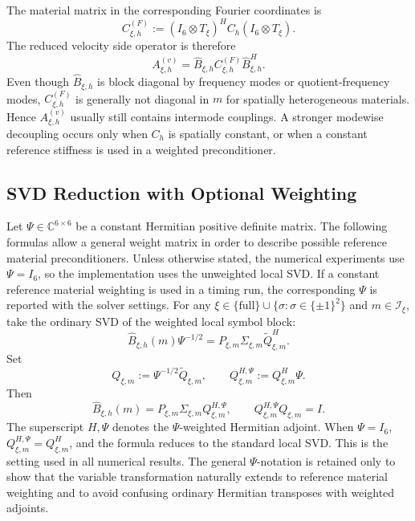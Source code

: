 \documentclass[11pt,oneside]{article}
\numberwithin{equation}{section}
\theoremstyle{plain}
\theoremstyle{remark}
\begin{document}
The material matrix in the corresponding Fourier coordinates is
\begin{equation}\label{eq:CF_xi_def}
C_{\xi,h}^{(F)}:=(I_6\otimes T_\xi)^HC_h(I_6\otimes T_\xi).
\end{equation}
The reduced velocity side operator is therefore
\begin{equation}\label{eq:Av_xi_def}
A_{\xi,h}^{(v)}=\widehat B_{\xi,h} C_{\xi,h}^{(F)}\widehat B_{\xi,h}^H.
\end{equation}
Even though \(\widehat B_{\xi,h}\) is block diagonal by frequency modes or quotient-frequency modes, \(C_{\xi,h}^{(F)}\) is generally not diagonal in \(m\) for spatially heterogeneous materials. Hence \(A_{\xi,h}^{(v)}\) usually still contains intermode couplings. A stronger modewise decoupling occurs only when \(C_h\) is spatially constant, or when a constant reference stiffness is used in a weighted preconditioner.

\subsection{SVD Reduction with Optional Weighting}

Let \(\Psi\in\mathbb C^{6\times6}\) be a constant Hermitian positive definite matrix. The following formulas allow a general weight matrix in order to describe possible reference material preconditioners. Unless otherwise stated, the numerical experiments use \(\Psi=I_6\), so the implementation uses the unweighted local SVD. If a constant reference material weighting is used in a timing run, the corresponding \(\Psi\) is reported with the solver settings. For any \(\xi\in \{\mathrm{full}\}\cup\{\sigma:\sigma\in\{\pm1\}^2\}\) and \(m\in\mathcal I_\xi\), take the ordinary SVD of the weighted local symbol block:
\begin{equation}\label{eq:weighted_svd_unified}
\widehat B_{\xi,h}(m)\Psi^{-1/2}
=P_{\xi,m}\Sigma_{\xi,m}\widetilde Q_{\xi,m}^H.
\end{equation}
Set
\[
Q_{\xi,m}:=\Psi^{-1/2}\widetilde Q_{\xi,m},
\qquad
Q_{\xi,m}^{H,\Psi}:=Q_{\xi,m}^H\Psi .
\]
Then
\begin{equation}\label{eq:weighted_svd_local_unified}
\widehat B_{\xi,h}(m)=P_{\xi,m}\Sigma_{\xi,m}Q_{\xi,m}^{H,\Psi},
\qquad
Q_{\xi,m}^{H,\Psi}Q_{\xi,m}=I.
\end{equation}
The superscript \(H,\Psi\) denotes the \(\Psi\)-weighted Hermitian adjoint. When \(\Psi=I_6\), \(Q_{\xi,m}^{H,\Psi}=Q_{\xi,m}^H\), and the formula reduces to the standard local SVD. This is the setting used in all numerical results. The general \(\Psi\)-notation is retained only to show that the variable transformation naturally extends to reference material weighting and to avoid confusing ordinary Hermitian transposes with weighted adjoints.
\end{document}
